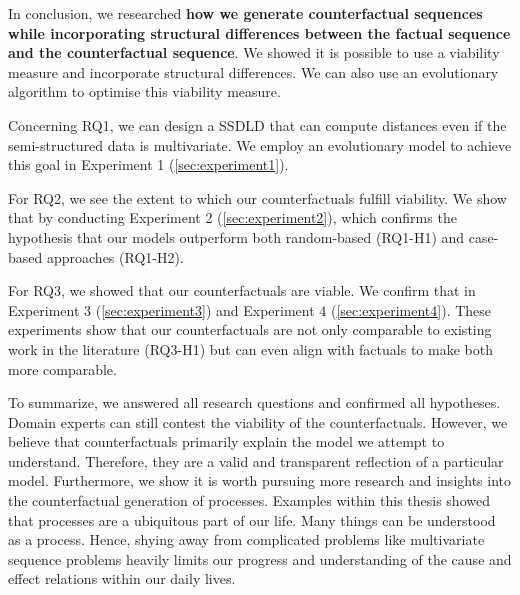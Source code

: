 \documentclass[./../../paper.tex]{subfiles}
\begin{document}
In conclusion, we researched \textbf{how we generate counterfactual sequences while incorporating structural differences between the factual sequence and the counterfactual sequence}. We showed it is possible to use a viability measure and incorporate structural differences. We can also use an evolutionary algorithm to optimise this viability measure. 

Concerning RQ1\footnotemark[1], we can design a \Gls{SSDLD} that can compute distances even if the semi-structured data is multivariate. We employ an evolutionary model to achieve this goal in Experiment 1 (\autoref{sec:experiment1}).

For RQ2\footnotemark[2], we see the extent to which our counterfactuals fulfill viability. 
We show that by conducting Experiment 2 (\autoref{sec:experiment2}), which confirms the hypothesis that our models outperform both random-based (RQ1-H1) and case-based approaches (RQ1-H2).  

For RQ3\footnotemark[3], we showed that our counterfactuals are viable. 
We confirm that in Experiment 3 (\autoref{sec:experiment3}) and Experiment 4 (\autoref{sec:experiment4}).
These experiments show that our counterfactuals are not only comparable to existing work in the literature (RQ3-H1) but can even align with factuals to make both more comparable.

To summarize, we answered all research questions and confirmed all hypotheses. Domain experts can still contest the viability of the counterfactuals. However, we believe that counterfactuals primarily explain the model we attempt to understand. Therefore, they are a valid and transparent reflection of a particular model. Furthermore, we show it is worth pursuing more research and insights into the counterfactual generation of processes. Examples within this thesis showed that processes are a ubiquitous part of our life. Many things can be understood as a process. Hence, shying away from complicated problems like multivariate sequence problems heavily limits our progress and understanding of the cause and effect relations within our daily lives. 

\end{document}
